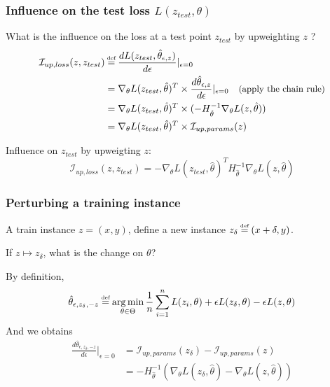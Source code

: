 \documentclass[UTF8]{beamer}
\newcommand\myeq{\stackrel{\mathclap{\tiny\mbox{def}}}{=}}
\DeclareMathOperator*{\argmin}{arg\,min}
\begin{document}
\begin{frame}
\frametitle{Influence on the test loss $L(z_{test}, \theta)$}
What is the influence on the loss at a test point $z_{test}$ by upweighting $z$ ?
\begin{align}
\mathcal{I}_{up,loss}(z, z_{test}) & \myeq\frac{dL(z_{test}, \hat\theta_{\epsilon, z})}{d\epsilon}\vert_{\epsilon=0}  \nonumber\\ 
& = \nabla_{\theta}L(z_{test}, \hat{\theta})^T\times \frac{d\hat\theta_{\epsilon, z}}{d\epsilon}\vert_{\epsilon=0}  \nonumber \quad \textnormal{\small(apply the chain rule)} \\
& = \nabla_\theta{}L(z_{test}, \hat\theta)^T\times (-H_{\hat\theta}^{-1}\nabla_{\theta}L(z, \hat\theta))\nonumber \\
& = \nabla_\theta{}L(z_{test}, \hat\theta)^T\times \mathcal{I}_{up,params}(z) \nonumber
\end{align}

Influence on $z_{test}$ by upweigting $z$:
\begin{equation}
\mathcal{I}_{up,loss}(z, z_{test}) = -\nabla_\theta{}L(z_{test}, \hat\theta)^TH_{\hat\theta}^{-1}\nabla_{\theta}L(z, \hat\theta)
\end{equation}
\end{frame}
\begin{frame}
\frametitle{Perturbing a training instance}
A train instance $z = (x, y)$, define a new instance $z_\delta \myeq (x + \delta, y)$. 
\begin{center}
If $z \mapsto z_\delta$, what is the change on $\theta$?
\end{center}

By definition,
\begin{equation}\nonumber
\hat\theta_{\epsilon, z_{\delta}, -z} \myeq \argmin_{\theta\in\Theta} \frac{1}{n}\sum_{i=1}^{n}L(z_i, \theta)+\epsilon L(z_\delta, \theta) - \epsilon L(z, \theta)
\end{equation}
And we obtains
\begin{align}
\frac{d\hat\theta_{\epsilon, z_\delta, -z}}{d\epsilon}\vert_{\epsilon = 0} &= \mathcal{I}_{up, params}(z_\delta) - \mathcal{I}_{up, params}(z) \nonumber\\
&= -H_{\hat\theta}^{-1}(\nabla_{\theta}L(z_\delta, \hat\theta) - \nabla_{\theta}L(z, \hat\theta))
\end{align}
\end{frame}
\end{document}
